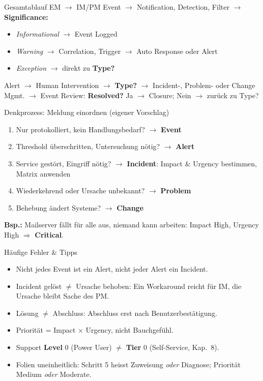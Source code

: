 \documentclass[a4paper, fontsize=7pt]{scrartcl}
\begin{document}
\begin{subbox}{Gesamtablauf EM $\to$ IM/PM}
Event $\to$ Notification, Detection, Filter $\to$ \textbf{Significance:}
\begin{itemize}
    \item \emph{Informational} $\to$ Event Logged
    \item \emph{Warning} $\to$ Correlation, Trigger $\to$ Auto Response oder Alert
    \item \emph{Exception} $\to$ direkt zu \textbf{Type?}
\end{itemize}
Alert $\to$ Human Intervention $\to$ \textbf{Type?} $\to$ Incident-, Problem- oder
Change Mgmt. $\to$ Event Review: \textbf{Resolved?} Ja $\to$ Closure; Nein $\to$
zurück zu Type?
\end{subbox}

\begin{subbox}{Denkprozess: Meldung einordnen (eigener Vorschlag)}
\begin{enumerate}
    \item Nur protokolliert, kein Handlungsbedarf? $\to$ \textbf{Event}
    \item Threshold überschritten, Untersuchung nötig? $\to$ \textbf{Alert}
    \item Service gestört, Eingriff nötig? $\to$ \textbf{Incident}: Impact \&
          Urgency bestimmen, Matrix anwenden
    \item Wiederkehrend oder Ursache unbekannt? $\to$ \textbf{Problem}
    \item Behebung ändert Systeme? $\to$ \textbf{Change}
\end{enumerate}
\textbf{Bsp.:} Mailserver fällt für alle aus, niemand kann arbeiten: Impact High,
Urgency High $\Rightarrow$ \textbf{Critical}.
\end{subbox}

\begin{subbox}{Häufige Fehler \& Tipps}
\begin{itemize}
    \item Nicht jedes Event ist ein Alert, nicht jeder Alert ein Incident.
    \item Incident gelöst $\neq$ Ursache behoben: Ein Workaround reicht für IM,
          die Ursache bleibt Sache des PM.
    \item Lösung $\neq$ Abschluss: Abschluss erst nach Benutzerbestätigung.
    \item Priorität = Impact $\times$ Urgency, nicht Bauchgefühl.
    \item Support \textbf{Level} 0 (Power User) $\neq$ \textbf{Tier} 0
          (Self-Service, Kap.\ 8).
    \item Folien uneinheitlich: Schritt 5 heisst Zuweisung \emph{oder} Diagnose;
          Priorität Medium \emph{oder} Moderate.
\end{itemize}
\end{subbox}
\end{document}
